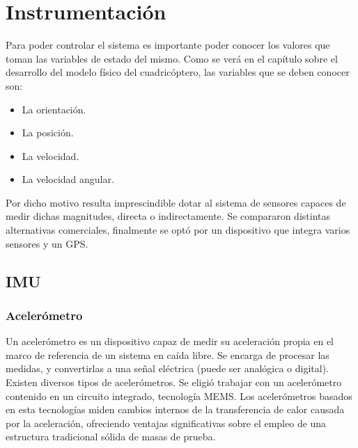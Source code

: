 \documentclass[main]{subfiles}
\begin{document}
\section{Instrumentaci\'on}

Para poder controlar el sistema es importante poder conocer los valores que toman las variables de estado del mismo. Como se ver\'a en el cap\'itulo sobre el desarrollo del modelo f\'isico del cuadric\'optero, las variables que se deben conocer son:

\begin{itemize}
\item La orientaci\'on.
\item La posici\'on.
\item La velocidad.
\item La velocidad angular.
\end{itemize}

Por dicho motivo resulta imprescindible dotar al sistema de sensores capaces de medir dichas magnitudes, directa o indirectamente. Se compararon distintas alternativas comerciales, finalmente se opt\'o por un dispositivo que integra varios sensores y un GPS.
\subsection{IMU}

\subsubsection{Aceler\'ometro}
\label{acelerometro}

Un aceler\'ometro es un dispositivo capaz de medir su aceleraci\'on propia en el marco de referencia de un sistema en ca\'ida libre. Se encarga de procesar las medidas, y convertirlas a una se\~nal el\'ectrica (puede ser anal\'ogica o digital).\\

Existen diversos tipos de aceler\'ometros. Se eligi\'o trabajar con un aceler\'ometro contenido en un circuito integrado, tecnolog\'ia MEMS. Los aceler\'ometros basados en esta tecnolog\'ias miden cambios internos de la transferencia de calor causada por la aceleraci\'on, ofreciendo ventajas significativas sobre el empleo de una estructura tradicional s\'olida de masas de prueba.\\
\end{document}

